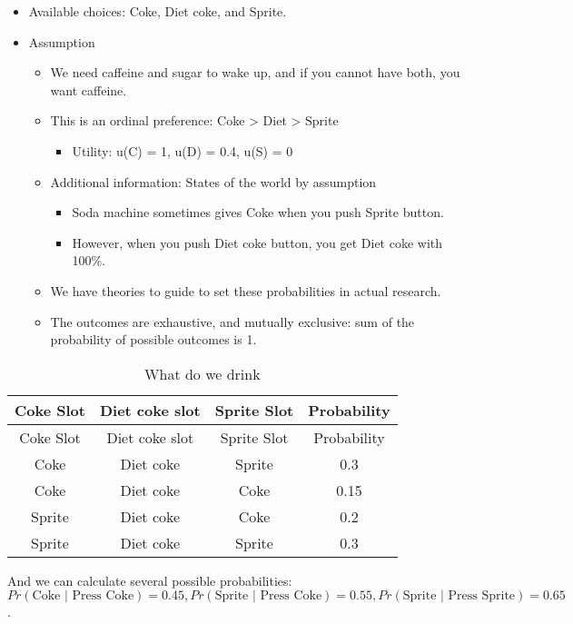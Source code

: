 \documentclass[]{book}
\providecommand{\tightlist}{%
  \setlength{\itemsep}{0pt}\setlength{\parskip}{0pt}}
\begin{document}
\begin{itemize}
  \begin{itemize}
  \item
    Available choices: Coke, Diet coke, and Sprite.
  \item
    Assumption

    \begin{itemize}
    \item
      We need caffeine and sugar to wake up, and if you cannot have both, you want caffeine.
    \item
      This is an ordinal preference: Coke \textgreater{} Diet \textgreater{} Sprite

      \begin{itemize}
      \tightlist
      \item
        Utility: u(C) = 1, u(D) = 0.4, u(S) = 0
      \end{itemize}
    \item
      Additional information: States of the world by assumption

      \begin{itemize}
      \tightlist
      \item
        Soda machine sometimes gives Coke when you push Sprite button.
      \item
        However, when you push Diet coke button, you get Diet coke with 100\%.
      \end{itemize}
    \item
      We have theories to guide to set these probabilities in actual research.
    \item
      The outcomes are exhaustive, and mutually exclusive: sum of the probability of possible outcomes is 1.
    \end{itemize}
  \end{itemize}
\end{itemize}

\begin{longtable}[]{@{}cccc@{}}
\caption{What do we drink}\tabularnewline
\toprule
Coke Slot & Diet coke slot & Sprite Slot & Probability\tabularnewline
\midrule
\endfirsthead
\toprule
Coke Slot & Diet coke slot & Sprite Slot & Probability\tabularnewline
\midrule
\endhead
Coke & Diet coke & Sprite & 0.3\tabularnewline
Coke & Diet coke & Coke & 0.15\tabularnewline
Sprite & Diet coke & Coke & 0.2\tabularnewline
Sprite & Diet coke & Sprite & 0.3\tabularnewline
\bottomrule
\end{longtable}

And we can calculate several possible probabilities: \(Pr(\text{Coke | Press Coke}) = 0.45, Pr(\text{Sprite | Press Coke}) = 0.55, Pr(\text{Sprite | Press Sprite}) = 0.65\).
\end{document}
